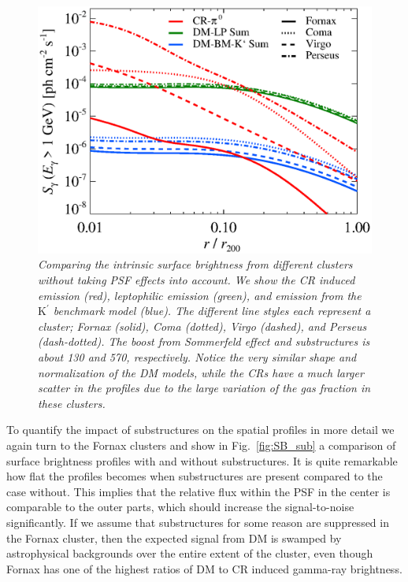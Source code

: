 \documentclass[10pt,aps,pra,reprint,amsmath,amsfonts,amssymb,showpacs,nofootinbib,floatfix]{revtex4-1}
\newcommand{\rmn}{\mathrm}
\newcommand{\Kp}{\rmn{K}^\prime}
\begin{document}
\begin{figure}
 \includegraphics[width=0.99\columnwidth]{figures/SB.v11.1GeV.SF300.SubMass.elmu.eps}
 \caption{\it Comparing the intrinsic surface brightness from
   different clusters without taking PSF effects into account. We show
   the CR induced emission (red), leptophilic emission (green), and
   emission from the $\Kp$ benchmark model (blue). The different
   line styles each represent a cluster; Fornax (solid), Coma (dotted),
   Virgo (dashed), and Perseus (dash-dotted). The boost from
   Sommerfeld effect and substructures is about 130 and 570,
   respectively. Notice the very similar shape and normalization of
   the DM models, while the CRs have a much larger scatter in the
   profiles due to the large variation of the gas fraction in these clusters.}
 \label{fig:SB_clu}
\end{figure}

To quantify the impact of substructures on the spatial profiles in
more detail we again turn to the Fornax clusters and show in
Fig.~\ref{fig:SB_sub} a comparison of surface brightness profiles with
and without substructures. It is quite remarkable how flat the
profiles becomes when substructures are present compared to the case
without. This implies that the relative flux within the PSF in the
center is comparable to the outer parts, which should increase the
signal-to-noise significantly. If we assume that substructures for
some reason are suppressed in the Fornax cluster, then the expected
signal from DM is swamped by astrophysical backgrounds over the entire
extent of the cluster, even though Fornax has one of the highest
ratios of DM to CR induced gamma-ray brightness.
\end{document}
